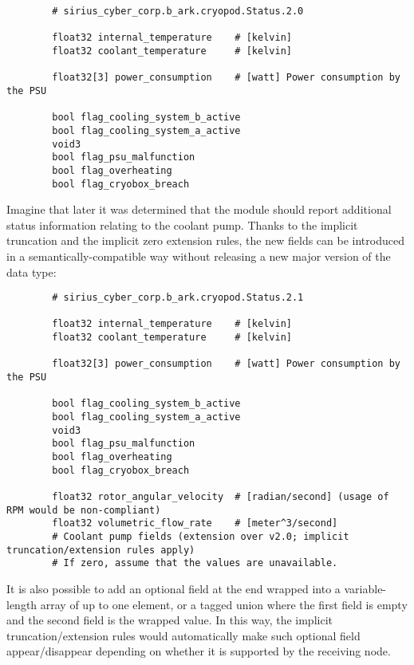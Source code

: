 \begin{remark}[breakable]
    \begin{verbatim}
        # sirius_cyber_corp.b_ark.cryopod.Status.2.0

        float32 internal_temperature    # [kelvin]
        float32 coolant_temperature     # [kelvin]

        float32[3] power_consumption    # [watt] Power consumption by the PSU

        bool flag_cooling_system_b_active
        bool flag_cooling_system_a_active
        void3
        bool flag_psu_malfunction
        bool flag_overheating
        bool flag_cryobox_breach
    \end{verbatim}

    Imagine that later it was determined that the module should report additional status information
    relating to the coolant pump.
    Thanks to the implicit truncation and the implicit zero extension rules,
    the new fields can be introduced in a semantically-compatible way without releasing
    a new major version of the data type:

    \begin{verbatim}
        # sirius_cyber_corp.b_ark.cryopod.Status.2.1

        float32 internal_temperature    # [kelvin]
        float32 coolant_temperature     # [kelvin]

        float32[3] power_consumption    # [watt] Power consumption by the PSU

        bool flag_cooling_system_b_active
        bool flag_cooling_system_a_active
        void3
        bool flag_psu_malfunction
        bool flag_overheating
        bool flag_cryobox_breach

        float32 rotor_angular_velocity  # [radian/second] (usage of RPM would be non-compliant)
        float32 volumetric_flow_rate    # [meter^3/second]
        # Coolant pump fields (extension over v2.0; implicit truncation/extension rules apply)
        # If zero, assume that the values are unavailable.
    \end{verbatim}

    It is also possible to add an optional field at the end wrapped into a variable-length
    array of up to one element, or a tagged union where the first field is empty
    and the second field is the wrapped value.
    In this way, the implicit truncation/extension rules would automatically make such optional field
    appear/disappear depending on whether it is supported by the receiving node.


\end{remark}
